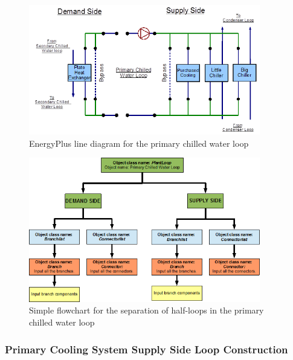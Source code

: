\begin{figure}[hbtp] %
\centering
\includegraphics[width=0.9\textwidth, height=0.9\textheight, keepaspectratio=true]{media/image091.png}
\caption{EnergyPlus line diagram for the primary chilled water loop \protect \label{fig:energyplus-line-diagram-for-the-primary}}
\end{figure}

\begin{figure}[hbtp] %
\centering
\includegraphics[width=0.9\textwidth, height=0.9\textheight, keepaspectratio=true]{media/image092.png}
\caption{Simple flowchart for the separation of half-loops in the primary chilled water loop \protect \label{fig:simple-flowchart-for-the-separation-of-half}}
\end{figure}

\subsubsection{Primary Cooling System Supply Side Loop Construction}\label{primary-cooling-system-supply-side-loop-construction}

